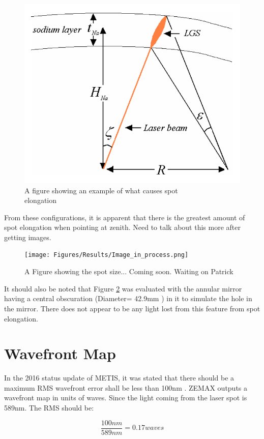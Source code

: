 \begin{figure}[h!]
\centering
\includegraphics[width=8 cm]{Figures/Results/spot_elongation.png}
\caption{A figure showing an example of what causes spot \\elongation \cite{sodium}}
\label{fig:spot_elong}
\end{figure}

From these configurations, it is apparent that there is the greatest amount of spot
elongation when pointing at zenith.  Need to talk about this more after getting
images.

\begin{figure}[h!]
\centering
\texttt{[image: Figures/Results/Image\_in\_process.png]}
\caption{A Figure showing the spot size... Coming soon.  Waiting on Patrick}
\label{fig:spot_array_elong}
\end{figure}


It should also be noted that Figure \ref{fig:spot_array_elong} was evaluated with
the annular mirror having a central obscuration (Diameter= 42.9mm \cite{arcier}) in
it to simulate the hole in the mirror.  There does not appear to be any light lost
from this feature from spot elongation.


\section{Wavefront Map}
\label{sec:wave_map}

In the 2016 status update of METIS, it was stated that there should be a maximum
RMS wavefront error shall be less than 100nm \cite{METISSPIE2016}.  ZEMAX outputs
a wavefront map in units of waves.  Since the light coming from the laser spot is
589nm.  The RMS should be:

\begin{equation}
    \frac{100nm}{589nm} = 0.17 waves
\end{equation}

